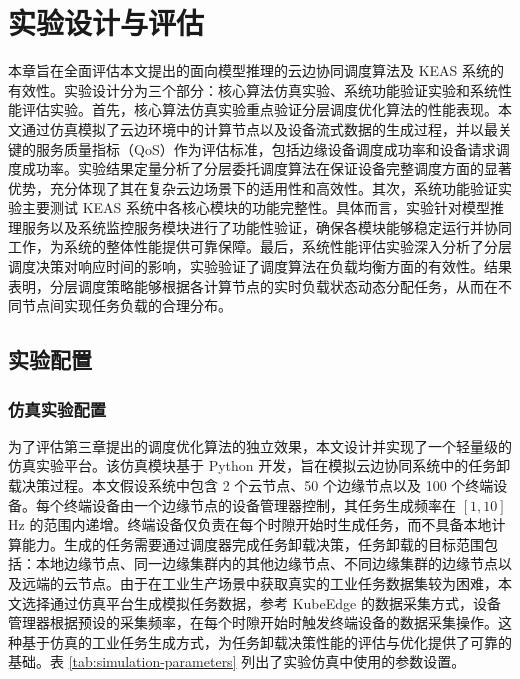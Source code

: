 \chapter{实验设计与评估}

本章旨在全面评估本文提出的面向模型推理的云边协同调度算法及 KEAS 系统的有效性。实验设计分为三个部分：核心算法仿真实验、系统功能验证实验和系统性能评估实验。首先，核心算法仿真实验重点验证分层调度优化算法的性能表现。本文通过仿真模拟了云边环境中的计算节点以及设备流式数据的生成过程，并以最关键的服务质量指标（QoS）作为评估标准，包括边缘设备调度成功率和设备请求调度成功率。实验结果定量分析了分层委托调度算法在保证设备完整调度方面的显著优势，充分体现了其在复杂云边场景下的适用性和高效性。其次，系统功能验证实验主要测试 KEAS 系统中各核心模块的功能完整性。具体而言，实验针对模型推理服务以及系统监控服务模块进行了功能性验证，确保各模块能够稳定运行并协同工作，为系统的整体性能提供可靠保障。最后，系统性能评估实验深入分析了分层调度决策对响应时间的影响，实验验证了调度算法在负载均衡方面的有效性。结果表明，分层调度策略能够根据各计算节点的实时负载状态动态分配任务，从而在不同节点间实现任务负载的合理分布。

\section{实验配置}

\subsection{仿真实验配置}

为了评估第三章提出的调度优化算法的独立效果，本文设计并实现了一个轻量级的仿真实验平台。该仿真模块基于 Python 开发，旨在模拟云边协同系统中的任务卸载决策过程。本文假设系统中包含 2 个云节点、50 个边缘节点以及 100 个终端设备。每个终端设备由一个边缘节点的设备管理器控制，其任务生成频率在 $ [1, 10] $ Hz 的范围内递增。终端设备仅负责在每个时隙开始时生成任务，而不具备本地计算能力。生成的任务需要通过调度器完成任务卸载决策，任务卸载的目标范围包括：本地边缘节点、同一边缘集群内的其他边缘节点、不同边缘集群的边缘节点以及远端的云节点。由于在工业生产场景中获取真实的工业任务数据集较为困难，本文选择通过仿真平台生成模拟任务数据，参考 KubeEdge 的数据采集方式，设备管理器根据预设的采集频率，在每个时隙开始时触发终端设备的数据采集操作。这种基于仿真的工业任务生成方式，为任务卸载决策性能的评估与优化提供了可靠的基础。表 \ref{tab:simulation-parameters} 列出了实验仿真中使用的参数设置。

